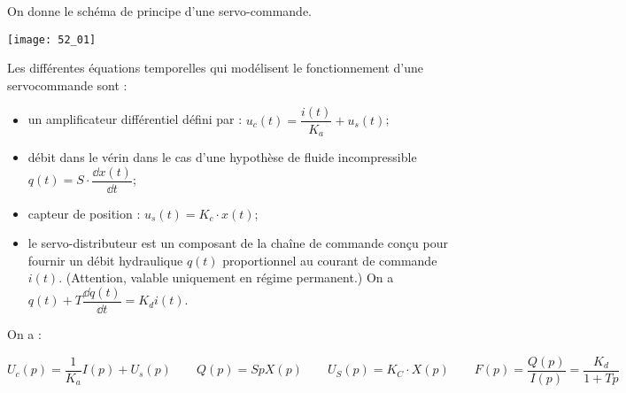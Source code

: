 \normaltrue \difficilefalse \tdifficilefalse
\correctiontrue


\setcounter{question}{0}%
\ifcorrection
\else
{}
\fi


\ifprof 
\else
On donne le schéma de principe d'une servo-commande.
\begin{marginfigure}
\texttt{[image: 52\_01]}
\end{marginfigure}

Les différentes équations temporelles qui modélisent le fonctionnement d'une servocommande sont :
\begin{itemize}
\item un amplificateur différentiel défini par : $u_c(t)=\dfrac{i(t)}{K_a}+u_s(t)$;
\item débit dans le vérin dans le cas d'une hypothèse de fluide incompressible $q(t)=S\cdot\dfrac{\dd x(t)}{\dd t}$;
\item capteur de position : $u_s(t)=K_c\cdot x(t)$;
\item le servo-distributeur est un composant de la chaîne de commande conçu pour fournir un débit hydraulique $q(t)$ proportionnel au courant de commande $i(t)$. (Attention, valable uniquement en régime permanent.) On a 
$q(t)+T \dfrac{\dd q(t)}{\dd t} = K_d i(t)$.
\end{itemize}
 \fi
 

\ifprof
On a :

$$U_c(p)=\dfrac{1}{K_a}I(p)+U_s(p) \quad \quad 
Q(p)=SpX(p) \quad \quad 
U_S(p)=K_C\cdot X(p) \quad \quad 
F(p)=\dfrac{Q(p)}{I(p)}=\dfrac{K_d}{1+Tp}$$

